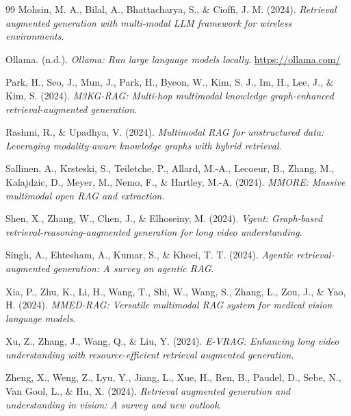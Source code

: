 \documentclass[12pt,a4paper,oneside]{report}
\begin{document}
\begin{thebibliography}{99}
Mohsin, M. A., Bilal, A., Bhattacharya, S., \& Cioffi, J. M. (2024). \textit{Retrieval augmented generation with multi-modal LLM framework for wireless environments}.

Ollama. (n.d.). \textit{Ollama: Run large language models locally}. \url{https://ollama.com/}

Park, H., Seo, J., Mun, J., Park, H., Byeon, W., Kim, S. J., Im, H., Lee, J., \& Kim, S. (2024). \textit{M3KG-RAG: Multi-hop multimodal knowledge graph-enhanced retrieval-augmented generation}.

Rashmi, R., \& Upadhya, V. (2024). \textit{Multimodal RAG for unstructured data: Leveraging modality-aware knowledge graphs with hybrid retrieval}.

Sallinen, A., Krsteski, S., Teiletche, P., Allard, M.-A., Lecoeur, B., Zhang, M., Kalajdzic, D., Meyer, M., Nemo, F., \& Hartley, M.-A. (2024). \textit{MMORE: Massive multimodal open RAG and extraction}.

Shen, X., Zhang, W., Chen, J., \& Elhoseiny, M. (2024). \textit{Vgent: Graph-based retrieval-reasoning-augmented generation for long video understanding}.

Singh, A., Ehtesham, A., Kumar, S., \& Khoei, T. T. (2024). \textit{Agentic retrieval-augmented generation: A survey on agentic RAG}.

Xia, P., Zhu, K., Li, H., Wang, T., Shi, W., Wang, S., Zhang, L., Zou, J., \& Yao, H. (2024). \textit{MMED-RAG: Versatile multimodal RAG system for medical vision language models}.

Xu, Z., Zhang, J., Wang, Q., \& Liu, Y. (2024). \textit{E-VRAG: Enhancing long video understanding with resource-efficient retrieval augmented generation}.

Zheng, X., Weng, Z., Lyu, Y., Jiang, L., Xue, H., Ren, B., Paudel, D., Sebe, N., Van Gool, L., \& Hu, X. (2024). \textit{Retrieval augmented generation and understanding in vision: A survey and new outlook}.

\end{thebibliography}
\end{document}
